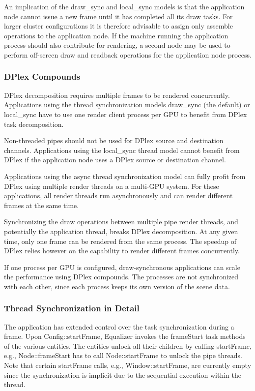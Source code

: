 \documentclass[10pt,a4]{scrartcl}
\begin{document}
An implication of the draw\_sync and local\_sync models is that the application
node cannot issue a new frame until it has completed all its draw tasks. For
larger cluster configurations it is therefore advisable to assign only assemble
operations to the application node. If the machine running the application
process should also contribute for rendering, a second node may be used to
perform off-screen draw and readback operations for the application node
process.

\subsubsection{\label{sAdvDPlex}DPlex Compounds}

DPlex decomposition requires multiple frames to be rendered
concurrently. Applications using the thread synchronization models
\textsf{draw\_sync} (the default) or \textsf{local\_sync} have to use
one render client process per GPU to benefit from DPlex task
decomposition.

Non-threaded pipes should not be used for DPlex source and destination
channels. Applications using the \textsf{local\_sync} thread model cannot
benefit from DPlex if the application node uses a DPlex source or destination
channel.

Applications using the \textsf{async} thread synchronization model can
fully profit from DPlex using multiple render threads on a multi-GPU
system. For these applications, all render threads run asynchronously
and can render different frames at the same time.

Synchronizing the draw operations between multiple pipe render threads,
and potentially the application thread, breaks DPlex decomposition. At
any given time, only one frame can be rendered from the same
process. The speedup of DPlex relies however on the capability to
render different frames concurrently.

If one process per GPU is configured, draw-synchronous applications can
scale the performance using DPlex compounds. The processes are not
synchronized with each other, since each process keeps its own version
of the scene data.


\subsubsection{Thread Synchronization in Detail}

The application has extended control over the task synchronization
during a frame. Upon \textsf{Config::startFrame}, Equalizer invokes the
\textsf{frameStart} task methods of the various entities. The entities
unlock all their children by calling \textsf{startFrame}, e.g.,
\textsf{Node::frameStart} has to call \textsf{Node::startFrame}
to unlock the pipe threads. Note that certain \textsf{startFrame} calls,
e.g., \textsf{Window::startFrame}, are currently empty since the
synchronization is implicit due to the sequential execution within the
thread.
\end{document}
